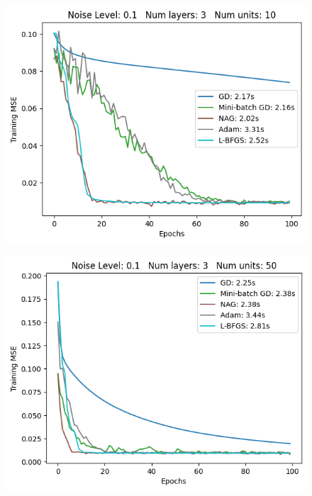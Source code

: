 \begin{figure}[h!]
    \begin{minipage}[t]{0.32\textwidth}
        \includegraphics[width=\textwidth]{figures/noise-level-0-1-num-layers-3-num-units-10.png}
        \label{fig:noise-level-0-1-num-layers-3-num-units-10}
    \end{minipage}
    \begin{minipage}[t]{0.32\textwidth}
        \includegraphics[width=\textwidth]{figures/noise-level-0-1-num-layers-3-num-units-50.png}
        \label{fig:noise-level-0-1-num-layers-3-num-units-50}
    \end{minipage}
    \begin{minipage}[t]{0.32\textwidth}

\end{minipage}
\end{figure}
